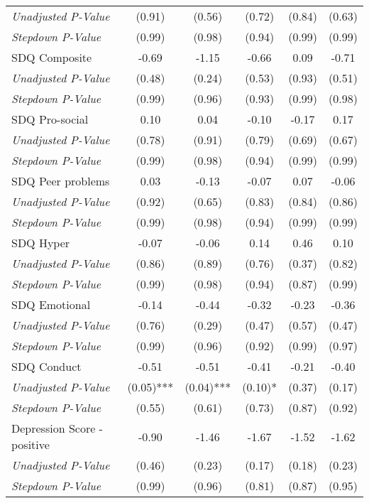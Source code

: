 \begin{tabular}{l c c c c c}
\quad \textit{Unadjusted P-Value} & (0.91) & (0.56) & (0.72) & (0.84) & (0.63) \\
\quad \textit{Stepdown P-Value} & (0.99) & (0.98) & (0.94) & (0.99) & (0.99) \\
SDQ Composite & -0.69 & -1.15 & -0.66 & 0.09 & -0.71 \\
\quad \textit{Unadjusted P-Value} & (0.48) & (0.24) & (0.53) & (0.93) & (0.51) \\
\quad \textit{Stepdown P-Value} & (0.99) & (0.96) & (0.93) & (0.99) & (0.98) \\
SDQ Pro-social & 0.10 & 0.04 & -0.10 & -0.17 & 0.17 \\
\quad \textit{Unadjusted P-Value} & (0.78) & (0.91) & (0.79) & (0.69) & (0.67) \\
\quad \textit{Stepdown P-Value} & (0.99) & (0.98) & (0.94) & (0.99) & (0.99) \\
SDQ Peer problems & 0.03 & -0.13 & -0.07 & 0.07 & -0.06 \\
\quad \textit{Unadjusted P-Value} & (0.92) & (0.65) & (0.83) & (0.84) & (0.86) \\
\quad \textit{Stepdown P-Value} & (0.99) & (0.98) & (0.94) & (0.99) & (0.99) \\
SDQ Hyper & -0.07 & -0.06 & 0.14 & 0.46 & 0.10 \\
\quad \textit{Unadjusted P-Value} & (0.86) & (0.89) & (0.76) & (0.37) & (0.82) \\
\quad \textit{Stepdown P-Value} & (0.99) & (0.98) & (0.94) & (0.87) & (0.99) \\
SDQ Emotional & -0.14 & -0.44 & -0.32 & -0.23 & -0.36 \\
\quad \textit{Unadjusted P-Value} & (0.76) & (0.29) & (0.47) & (0.57) & (0.47) \\
\quad \textit{Stepdown P-Value} & (0.99) & (0.96) & (0.92) & (0.99) & (0.97) \\
SDQ Conduct & -0.51 & -0.51 & -0.41 & -0.21 & -0.40 \\
\quad \textit{Unadjusted P-Value} & (0.05)*** & (0.04)*** & (0.10)* & (0.37) & (0.17) \\
\quad \textit{Stepdown P-Value} & (0.55) & (0.61) & (0.73) & (0.87) & (0.92) \\
Depression Score - positive & -0.90 & -1.46 & -1.67 & -1.52 & -1.62 \\
\quad \textit{Unadjusted P-Value} & (0.46) & (0.23) & (0.17) & (0.18) & (0.23) \\
\quad \textit{Stepdown P-Value} & (0.99) & (0.96) & (0.81) & (0.87) & (0.95) \\
\bottomrule
\end{tabular}
